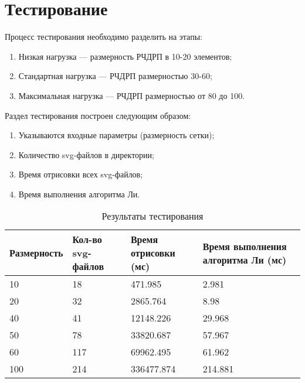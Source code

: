 \chapter{Тестирование}
\label{cha:ch_5}
Процесс тестирования необходимо разделить на этапы:
\begin{enumerate}
	\item Низкая нагрузка --- размерность РЧДРП в 10-20 элементов;
	\item Стандартная нагрузка --- РЧДРП размерностью 30-60;
	\item Максимальная нагрузка --- РЧДРП размерностью от 80 до 100.
\end{enumerate}

Раздел тестирования построен следующим образом:
\begin{enumerate}
	\item Указываются входные параметры (размерность сетки);
	\item Количество svg-файлов в директории;
	\item Время отрисовки всех svg-файлов;
	\item Время выполнения алгоритма Ли.
\end{enumerate}

\begin{table}[]
\centering
\label{my-label}
\begin{tabular}{|l|l|l|l|}
\hline
\textbf{Размерность} & \multicolumn{1}{|p{3cm}|}{\textbf{Кол-во svg-файлов}} & \multicolumn{1}{|p{3cm}|}{\textbf{Время отрисовки (мс)}} & \multicolumn{1}{|p{3cm}|}{\textbf{Время выполнения алгоритма Ли (мс)}} \\ \hline

10                   & 18                         & 471.985                        & 2.981                                           \\ \hline
20                   & 32                         & 2865.764                       & 8.98                                            \\ \hline
40                   & 41                         & 12148.226                      & 29.968                                          \\ \hline
50                   & 78                         & 33820.687                      & 57.967                                          \\ \hline
60                   & 117                        & 69962.495                      & 61.962                                          \\ \hline
100                  & 214                        & 336477.874                     & 214.881                                          \\ \hline
\end{tabular}
\caption{Результаты тестирования}
\end{table}